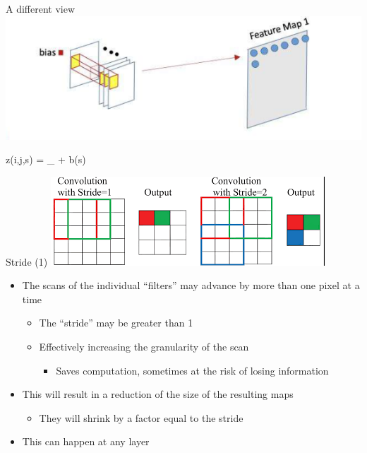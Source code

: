 \documentclass[serif, aspectratio=169]{beamer}
\begin{document}
	\begin{frame}{A different view}
	\centering
	\includegraphics[keepaspectratio, scale=0.9]{pic/diff_view.png}
	
	
	z(i,j,s) = _{} + b(s)
	
	\end{frame}
	\begin{frame}{Stride (1)}
		\centering
		\includegraphics[keepaspectratio, scale=0.9]{pic/stride.png}
		\begin{itemize}
			\item The scans of the individual ``filters'' may advance by more than one pixel at a time
			\begin{itemize}
				\item The ``stride'' may be greater than 1
				\item Effectively increasing the granularity of the scan
				\begin{itemize}
					\item Saves computation, sometimes at the risk of losing information
				\end{itemize}
			\end{itemize}
			\item This will result in a reduction of the size of the resulting maps
			\begin{itemize}
				\item They will shrink by a factor equal to the stride
			\end{itemize}
			\item This can happen at any layer
		\end{itemize}
	\end{frame}
\end{document}
